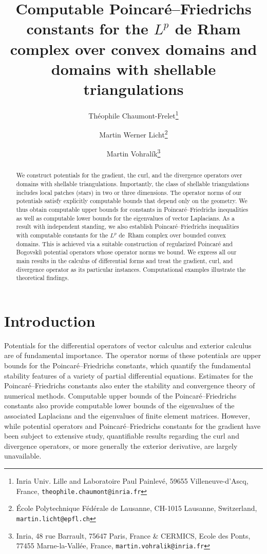 \documentclass[10pt,a4paper]{article}
\title{Computable Poincar\'e--Friedrichs constants for the $L^{p}$ de Rham complex over convex domains and domains with shellable triangulations}
\author{
    Th\'eophile Chaumont-Frelet\thanks{Inria Univ. Lille and Laboratoire Paul Painlev\'e, 59655 Villeneuve-d'Ascq, France, \texttt{theophile.chaumont@inria.fr}} \and
    Martin Werner Licht\thanks{\'Ecole Polytechnique F\'ed\'erale de Lausanne, CH-1015 Lausanne, Switzerland, \texttt{martin.licht@epfl.ch}} \and
    Martin Vohral\'ik\thanks{Inria, 48 rue Barrault, 75647 Paris, France \& CERMICS, Ecole des Ponts, 77455 Marne-la-Vall\'ee, France, \texttt{martin.vohralik@inria.fr}}
}
\begin{document}
\maketitle

\begin{abstract}
    We construct potentials for the gradient, the curl, and the divergence operators over domains with shellable triangulations. 
    Importantly, the class of shellable triangulations includes local patches (stars) in two or three dimensions. 
    The operator norms of our potentials satisfy explicitly computable bounds that depend only on the geometry. 
    We thus obtain computable upper bounds for constants in Poincar\'e--Friedrichs inequalities as well as computable lower bounds for the eigenvalues of vector Laplacians. 
    As a result with independent standing, we also establish Poincar\'e--Friedrichs inequalities with computable constants for the $L^{p}$ de~Rham complex over bounded convex domains. 
    This is achieved via a suitable construction of regularized Poincar\'e and Bogovski\u{\i} potential operators whose operator norms we bound.
    We express all our main results in the calculus of differential forms and treat the gradient, curl, and divergence operator as its particular instances. 
    Computational examples illustrate the theoretical findings.
\end{abstract}


\tableofcontents
 



\section{Introduction}\label{section:intro}

Potentials for the differential operators of vector calculus and exterior calculus are of fundamental importance. 
The operator norms of these potentials are upper bounds for the Poincar\'e--Friedrichs constants, 
which quantify the fundamental stability features of a variety of partial differential equations. 
Estimates for the Poincar\'e--Friedrichs constants also enter the stability and convergence theory of numerical methods. 
Computable upper bounds of the Poincar\'e--Friedrichs constants also provide computable lower bounds of the eigenvalues of the associated Laplacians and the eigenvalues of finite element matrices. 
However, while potential operators and Poincar\'e--Friedrichs constants for the gradient have been subject to extensive study,
quantifiable results regarding the curl and divergence operators, or more generally the exterior derivative, are largely unavailable.
\end{document}
